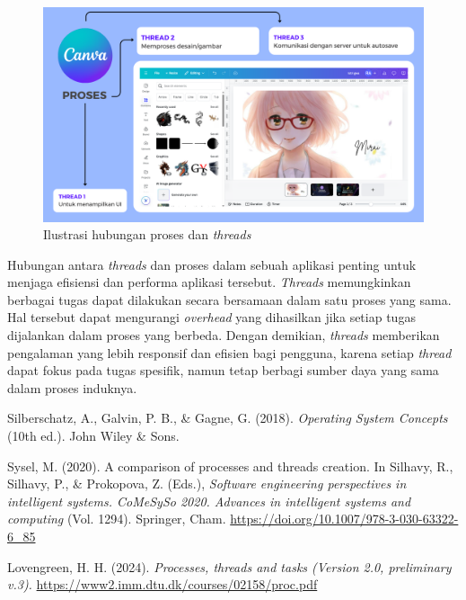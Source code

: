 \documentclass[12pt]{article}
\begin{document}
\begin{enumerate}
    \begin{figure}[h]
        \centering
        \includegraphics[width=1\linewidth]{asset/process-and-threads-illustration.png}
        \caption{Ilustrasi hubungan proses dan \textit{threads}}
        \label{fig:ilustrasi-proses-dan-threads}
    \end{figure}
    
\end{enumerate}

\hspace{1cm}

Hubungan antara \textit{threads} dan proses dalam sebuah aplikasi penting untuk menjaga efisiensi dan performa aplikasi tersebut. \textit{Threads} memungkinkan berbagai tugas dapat dilakukan secara bersamaan dalam satu proses yang sama. Hal tersebut dapat mengurangi \textit{overhead} yang dihasilkan jika setiap tugas dijalankan dalam proses yang berbeda. Dengan demikian, \textit{threads} memberikan pengalaman yang lebih responsif dan efisien bagi pengguna, karena setiap \textit{thread} dapat fokus pada tugas spesifik, namun tetap berbagi sumber daya yang sama dalam proses induknya.

\begin{thebibliography}{99}

    Silberschatz, A., Galvin, P. B., \& Gagne, G. (2018). \textit{Operating System Concepts} (10th ed.). John Wiley \& Sons.

    Sysel, M. (2020). A comparison of processes and threads creation. In Silhavy, R., Silhavy, P., \& Prokopova, Z. (Eds.), \textit{Software engineering perspectives in intelligent systems. CoMeSySo 2020. Advances in intelligent systems and computing} (Vol. 1294). Springer, Cham. \url{https://doi.org/10.1007/978-3-030-63322-6_85}

    Lovengreen, H. H. (2024). \textit{Processes, threads and tasks (Version 2.0, preliminary v.3).} \url{https://www2.imm.dtu.dk/courses/02158/proc.pdf}

\end{thebibliography}
\end{document}
